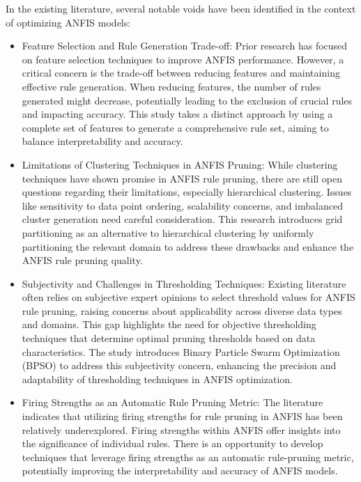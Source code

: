 In the existing literature, several notable voids have been identified in the context of optimizing ANFIS models:
\begin{itemize}
    \item Feature Selection and Rule Generation Trade-off: Prior research has focused on feature selection techniques to improve ANFIS performance. However, a critical concern is the trade-off between reducing features and maintaining effective rule generation. When reducing features, the number of rules generated might decrease, potentially leading to the exclusion of crucial rules and impacting accuracy. This study takes a distinct approach by using a complete set of features to generate a comprehensive rule set, aiming to balance interpretability and accuracy.

    \item Limitations of Clustering Techniques in ANFIS Pruning: While clustering techniques have shown promise in ANFIS rule pruning, there are still open questions regarding their limitations, especially hierarchical clustering. Issues like sensitivity to data point ordering, scalability concerns, and imbalanced cluster generation need careful consideration. This research introduces grid partitioning as an alternative to hierarchical clustering by uniformly partitioning the relevant domain to address these drawbacks and enhance the ANFIS rule pruning quality.

     \item Subjectivity and Challenges in Thresholding Techniques: Existing literature often relies on subjective expert opinions to select threshold values for ANFIS rule pruning, raising concerns about applicability across diverse data types and domains. This gap highlights the need for objective thresholding techniques that determine optimal pruning thresholds based on data characteristics. The study introduces Binary Particle Swarm Optimization (BPSO) to address this subjectivity concern, enhancing the precision and adaptability of thresholding techniques in ANFIS optimization.

    \item Firing Strengths as an Automatic Rule Pruning Metric: The literature indicates that utilizing firing strengths for rule pruning in ANFIS has been relatively underexplored. Firing strengths within ANFIS offer insights into the significance of individual rules. There is an opportunity to develop techniques that leverage firing strengths as an automatic rule-pruning metric, potentially improving the interpretability and accuracy of ANFIS models.
\end{itemize}